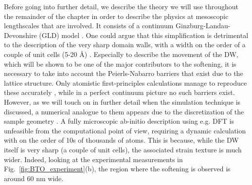 Before going into further detail, we describe the theory we will use throughout the remainder of the chapter in order to describe the physics at mesoscopic lengthscales that are involved.
It consists of a continuum Ginzburg-Landau-Devonshire (GLD) model \cite{Zhirnov1959,L.N.Bulaevskii1963,Marton2010}.
One could argue that this simplification is detrimental to the description of the very sharp domain walls, with a width on the order of a couple of unit cells (5-20 \AA) \cite{Zhirnov1959}.
Especially to describe the movement of the DW, which will be shown to be one of the major contributors to the softening, it is necessary to take into account the Peierls-Nabarro barriers that exist due to the lattice structure.
Only atomistic first-principles calculations manage to reproduce these accurately \cite{Meyer2002}, while in a perfect continuum picture no such barriers exist.
However, as we will touch on in further detail when the simulation technique is discussed, a numerical analogue to them appears due to the discretization of the sample geometry \cite{Marton2018}.  
A fully microscopic ab-initio description using e.g. DFT is unfeasible from the computational point of view, requiring a dynamic calculation with on the order of 10s of thousands of atoms.
This is because, while the DW itself is very sharp (a couple of unit cells), the associated strain texture is much wider.
Indeed, looking at the experimental measurements in Fig.~\ref{fig:BTO_experiment}(b), the region where the softening is observed is around 60 nm wide.

